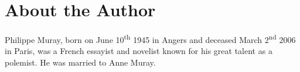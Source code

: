 \chapter*{About the Author}
\label{ch:author}

\begin{center}
	\fboxsep=0mm
	\fboxrule=4pt
\end{center}

Philippe Muray, born on June 10\textsuperscript{th} 1945 in Angers and deceased March 2\textsuperscript{nd} 2006 in Paris, was a French essayist and novelist known for his great talent as a polemist. He was married to Anne Muray.